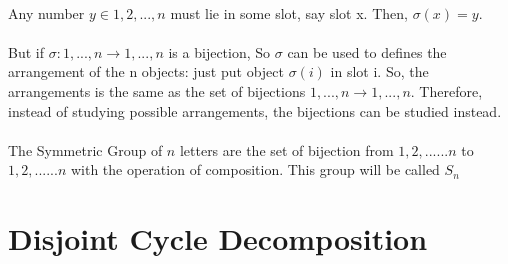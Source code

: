 \paragraph{}
Any number $y \in {1, 2, . . . , n}$ must lie in some slot, say slot x. Then, $\sigma(x) = y$.
\paragraph{}
But if $\sigma: {1, . . . , n} \rightarrow {1, . . . , n}$ is a bijection, So $\sigma$ can be used to defines the arrangement of the n
objects: just put object $\sigma(i)$ in slot i. So, the arrangements is the same as the set of
bijections ${1, . . . , n} \rightarrow {1, . . . , n}$. Therefore, instead of studying possible arrangements, the bijections can be studied instead.
\paragraph{}

The Symmetric Group of $n$ letters are the set of bijection from ${1,2,......n}$ to ${1,2,......n}$ with the operation of composition. This group will be called $S_n$

\pagebreak{}
\section{Disjoint Cycle Decomposition}

